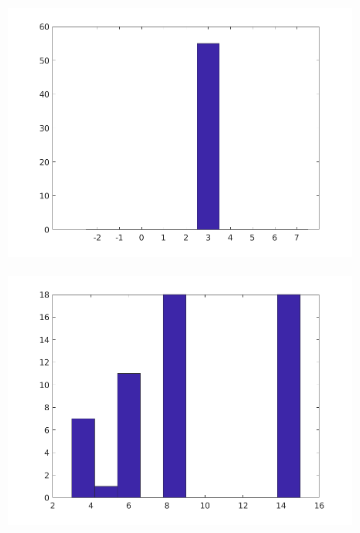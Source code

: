 \documentclass[11pt,letter]{article}%
\numberwithin{equation}{section}
\begin{document}
\begin{figure}[!h]
    \centering
    \begin{subfigure}[b]{0.45\textwidth}
            \centering
            \includegraphics[width=\textwidth]{../FIG1.png}
    \label{fig:fig1}
    \end{subfigure}
\begin{subfigure}[b]{0.45\textwidth}
            \centering
            \includegraphics[width=\textwidth]{../FIG2.png}
    \label{fig:fig2}
    \end{subfigure}
    \begin{subfigure}[b]{0.45\textwidth}
            \centering

\end{subfigure}
\end{figure}
\end{document}
